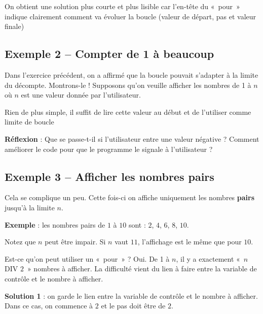 		On obtient une solution plus courte et plus lisible 
		car l'en-tête du «~pour~» indique clairement
		comment va évoluer la boucle
		(valeur de départ, pas et valeur finale)

	\subsection{Exemple 2 -- Compter de 1 à beaucoup}

		Dans l'exercice précédent, on a
		affirmé que la boucle pouvait s'adapter à la limite du
		décompte. Montrons-le ! Supposons qu'on veuille
		afficher les nombres de 1 à $n$ où $n$ est une valeur 
		donnée par l'utilisateur.

		Rien de plus simple, il suffit de lire cette
		valeur au début et de l'utiliser comme limite de boucle


		\textbf{Réflexion} : Que se passe-t-il si l'utilisateur entre une valeur négative ?
		Comment améliorer le code pour que le programme
		le signale à l'utilisateur ?

	\subsection{Exemple 3 -- Afficher les nombres pairs}

		Cela se complique un peu. Cette fois-ci on
		affiche uniquement les nombres \textbf{pairs} jusqu'à la limite $n$.
		
		\textbf{Exemple} : 
		les nombres pairs de $1$ à $10$ sont : $2$, $4$, $6$, $8$, $10$.
		
		Notez que $n$ peut être impair. Si $n$ vaut $11$, 
		l'affichage est le même que pour $10$.

		Est-ce qu'on peut utiliser un «~pour~» ? 
		Oui. De 1 à $n$, il y a exactement «~$n$ DIV $2$~» nombres à afficher. 
		La difficulté vient du lien à faire entre la variable de
		contrôle et le nombre à afficher.

		\textbf{Solution 1} : 
		on garde le lien entre la variable de contrôle 
		et le nombre à afficher. 
		Dans ce cas, on commence à $2$ et le pas doit être de $2$.

